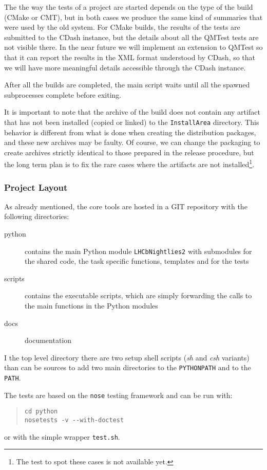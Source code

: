 \documentclass{lhcbnote}
\begin{document}
The the way the tests of a project are started depends on the type of the build
(CMake or CMT), but in both cases we produce the same kind of summaries that
were used by the old system.  For CMake builds, the results of the tests are
submitted to the CDash instance, but the details about all the QMTest tests are
not visible there.  In the near future we will implement an extension to QMTest
so that it can report the results in the XML format understood by CDash, so that
we will have more meaningful details accessible through the CDash instance.

After all the builds are completed, the main script waits until all the spawned
subprocesses complete before exiting.

It is important to note that the archive of the build does not contain any
artifact that has not been installed (copied or linked) to the
\texttt{InstallArea} directory.  This behavior is different from what is done
when creating the distribution packages, and these new archives may be faulty.
Of course, we can change the packaging to create archives strictly identical to
those prepared in the release procedure, but the long term plan is to fix the
rare cases where the artifacts are not installed\footnote{The test to spot these
cases is not available yet.}.

\subsubsection{Project Layout}
As already mentioned, the core tools are hosted in a GIT repository with the
following directories:
\begin{description}
  \item[python] contains the main Python module \texttt{LHCbNightlies2} with
submodules for the shared code, the task specific functions, templates and for
the tests
  \item[scripts] contains the executable scripts, which are simply forwarding
the calls to the main functions in the Python modules
  \item[docs] documentation
\end{description}
I the top level directory there are two setup shell scripts (\emph{sh} and
\emph{csh} variants) than can be sources to add two main directories to the
\texttt{PYTHONPATH} and to the \texttt{PATH}.

The tests are based on the \texttt{nose} testing framework\cite{nose} and can be
run with:
\begin{quote}
\begin{verbatim}
cd python
nosetests -v --with-doctest
\end{verbatim}
\end{quote}
or with the simple wrapper \texttt{test.sh}.
\end{document}
